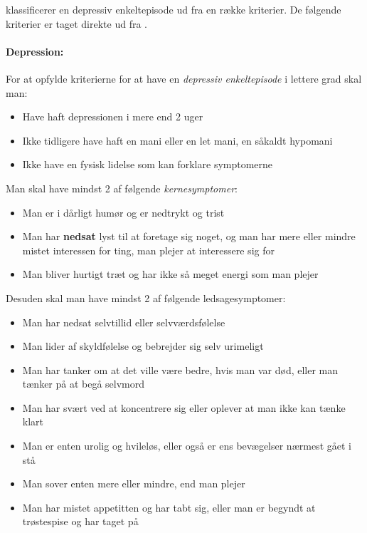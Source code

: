  klassificerer en depressiv enkeltepisode ud fra en række kriterier.
De følgende kriterier er taget direkte ud fra \citet{misc:netpsykdepression}.

\begin{mdframed}
\paragraph{Depression:}
For at opfylde kriterierne for at have en \textit{depressiv enkeltepisode} i lettere grad skal man:
\begin{itemize}
	\item Have haft depressionen i mere end 2 uger
	\item Ikke tidligere have haft en mani eller en let mani, en såkaldt hypomani
	\item Ikke have en fysisk lidelse som kan forklare symptomerne
\end{itemize}
Man skal have mindst 2 af følgende \textit{kernesymptomer}:
\begin{itemize}
	\item Man er i dårligt humør og er nedtrykt og trist
	\item Man har \textbf{nedsat} lyst til at foretage sig noget, og man har mere eller mindre mistet interessen for ting, man plejer at interessere sig for
	\item Man bliver hurtigt træt og har ikke så meget energi som man plejer
\end{itemize}
Desuden skal man have mindst 2 af følgende ledsagesymptomer:
\begin{itemize}
	\item Man har nedsat selvtillid eller selvværdsfølelse
	\item Man lider af skyldfølelse og bebrejder sig selv urimeligt
	\item Man har tanker om at det ville være bedre, hvis man var død, eller man tænker på at begå selvmord
	\item Man har svært ved at koncentrere sig eller oplever at man ikke kan tænke klart
	\item Man er enten urolig og hvileløs, eller også er ens bevægelser nærmest gået i stå
	\item Man sover enten mere eller mindre, end man plejer
	\item Man har mistet appetitten og har tabt sig, eller man er begyndt at trøstespise og har taget på
\end{itemize}
\end{mdframed}

